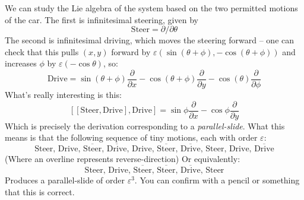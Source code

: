 \documentclass{article}
\begin{document}
We can study the Lie algebra of the system based on the two permitted motions of the car. The first is infinitesimal steering, given by 
$$\mathrm{Steer}=\partial/\partial\theta$$ 
The second is infinitesimal driving, which moves the steering forward -- one can check that this pulls $(x,y)$ forward by $\varepsilon(\sin(\theta+\phi),-\cos(\theta+\phi))$ and increases $\phi$ by $\varepsilon(-\cos\theta)$, so:
$$\mathrm{Drive}=\sin(\theta+\phi)\frac{\partial}{\partial x}-\cos(\theta+\phi)\frac{\partial}{\partial y}-\cos(\theta)\frac{\partial}{\partial\phi}$$
What's really interesting is this:
$$[[\mathrm{Steer},\mathrm{Drive}],\mathrm{Drive}] = \sin\phi\frac{\partial}{\partial x}-\cos\phi\frac{\partial}{\partial y}$$
Which is precisely the derivation corresponding to a \emph{parallel-slide}. What this means is that the following sequence of tiny motions, each with order $\varepsilon$:
$$\text{Steer, Drive, }\overline{\text{Steer} }\text{, }\overline{\text{Drive}}\text{, Drive, }\overline{\text{Steer}}\text{, }\overline{\text{Drive}}\text{, Steer, Drive, }\overline{\text{Drive}}$$
(Where an overline represents reverse-direction) Or equivalently:
$$\text{Steer, Drive, }\overline{\text{Steer}}\text{, }\overline{\text{Steer}}\text{, }\overline{\text{Drive}}\text{, Steer}$$
Produces a parallel-slide of order $\varepsilon^3$. You can confirm with a pencil or something that this is correct.
\end{document}
